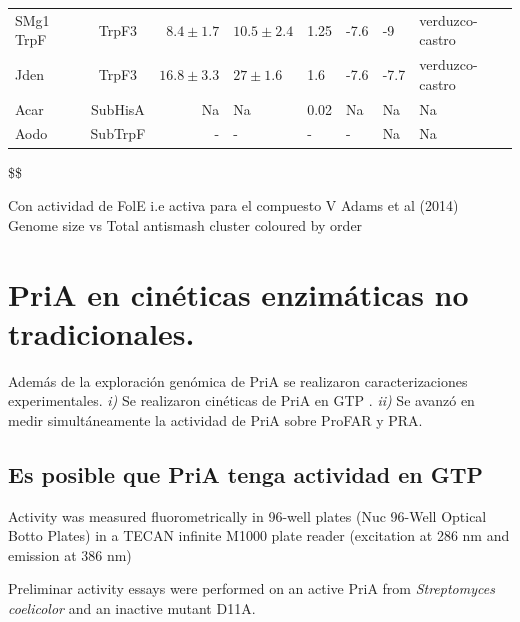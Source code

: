 \documentclass[12pt,twoside]{reedthesis}
\begin{document}
\begin{tabular}{ l c r l l l l l}
  SMg1 TrpF &TrpF3   &$8.4\pm1.7$    &$10.5\pm2.4$    &1.25       &-7.6    &-9        &verduzco-castro     \\ [1ex] 
  Jden      &TrpF3   &$16.8\pm3.3$   &$27\pm1.6$      &1.6        &-7.6    &-7.7      &verduzco-castro     \\ [1ex] 
  Acar      &SubHisA &Na         &Na          &0.02       &Na      &Na        &Na                                    \\ [1ex] 
  Aodo      &SubTrpF &-          &-           &-          &-       &Na        &Na                                    \\ [1ex]
  
  \hline
  \end{tabular}
  
  \label{table:mi table}\$\$
  
  Con actividad de FolE i.e activa para el compuesto V Adams et al (2014)
  Genome size vs Total antismash cluster coloured by order
  
  \clearpage  
  
  \begin{Shaded}
  \begin{Highlighting}[]
  \end{Highlighting}
  \end{Shaded}
  
  \section{PriA en cinéticas enzimáticas no
  tradicionales.}\label{pria-en-cineticas-enzimaticas-no-tradicionales.}
  
  Además de la exploración genómica de PriA se realizaron
  caracterizaciones experimentales. \emph{i)} Se realizaron cinéticas de
  PriA en GTP . \emph{ii)} Se avanzó en medir simultáneamente la actividad
  de PriA sobre ProFAR y PRA.
  
  \subsection{Es posible que PriA tenga actividad en
  GTP}\label{es-posible-que-pria-tenga-actividad-en-gtp}
  
  Activity was measured fluorometrically in 96-well plates (Nuc 96-Well
  Optical Botto Plates) in a TECAN infinite M1000 plate reader (excitation
  at 286 nm and emission at 386 nm)
  
  Preliminar activity essays were performed on an active PriA from
  \emph{Streptomyces coelicolor} and an inactive mutant D11A.
  
\end{document}
